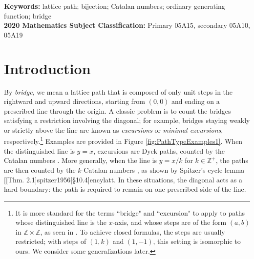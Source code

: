 \documentclass[10pt]{article}
\makeatletter
\newcommand{\citecomment}[2][]{\citen{#2}#1\citevar}
\newcommand{\citeone}[1]{\citecomment{#1}}
\newcommand{\citetwo}[2][]{\citecomment[,~#1]{#2}}
\newcommand{\citevar}{\@ifnextchar\bgroup{;~\citeone}{\@ifnextchar[{;~\citetwo}{]}}}
\newcommand{\citefirst}{\@ifnextchar\bgroup{\citeone}{\@ifnextchar[{\citetwo}{]}}}
\newcommand{\cites}{[\citefirst}
\makeatother
\begin{document}

\noindent \textbf{Keywords:} lattice path; bijection; Catalan numbers; ordinary generating function; bridge\\

\noindent \textbf{2020 Mathematics Subject Classification:} Primary 05A15, secondary 05A10, 05A19

\section{Introduction}

By \emph{bridge}, we mean a lattice path that is composed of only unit steps in the rightward and upward directions, starting from $(0,0)$ and ending on a prescribed line through the origin. A classic problem is to count the bridges satisfying a restriction involving the diagonal; for example, bridges staying weakly or strictly above the line are known as \emph{excursions} or \emph{minimal excursions}, respectively.\footnote{It is more standard for the terms ``bridge" and ``excursion" to apply to paths whose distinguished line is the $x$-axis, and whose steps are of the form $(a,b)$ in $\mathbb{Z}\times\mathbb{Z}$, as seen in \cite[Fig. 1]{banderier2002}.  To achieve closed formulas, the steps are usually restricted; with steps of $(1,k)$ and $(1,-1)$, this setting is isomorphic to ours. We consider some generalizations later.}  Examples are provided in Figure \ref{fig:PathTypeExamples1}.  When the distinguished line is $y=x$, excursions are Dyck paths, counted by the Catalan numbers \cite[Prop. 1]{whitworth1878}. More generally, when the line is $y=x/k$ for $k\in \mathbb{Z}^+$, the paths are then counted by the $k$-Catalan numbers \cite{barbier1887,lyness1941}, as shown by Spitzer's cycle lemma \cites[Thm. 2.1]{spitzer1956}[\S10.4]{encylatt}.  In these situations, the diagonal acts as a hard boundary: the path is required to remain on one prescribed side of the line.
\end{document}
